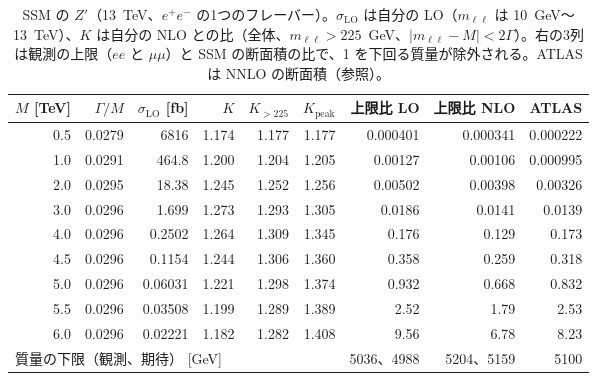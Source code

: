 \documentclass[a4paper,10pt]{ltjsarticle}
\begin{document}
\begin{table}[htbp]
\centering\small
\caption{SSM の $Z'$（13~TeV、$e^+e^-$ の1つのフレーバー）。$\sigma_{\mathrm{LO}}$ は自分の LO（$m_{\ell\ell}$ は 10~GeV〜13~TeV）、$K$ は自分の NLO との比（全体、$m_{\ell\ell}>225$~GeV、$|m_{\ell\ell}-M|<2\Gamma$）。右の3列は観測の上限（$ee$ と $\mu\mu$）と SSM の断面積の比で、1 を下回る質量が除外される。ATLAS は NNLO の断面積（参照）。}
\label{tab:zp}
\begin{tabular}{rrrrrrrrr}
\toprule
$M$ [TeV] & $\Gamma/M$ & $\sigma_{\mathrm{LO}}$ [fb] & $K$ & $K_{>225}$ & $K_{\mathrm{peak}}$ & 上限比 LO & 上限比 NLO & ATLAS \\
\midrule
0.5 & 0.0279 & 6816 & 1.174 & 1.177 & 1.177 & 0.000401 & 0.000341 & 0.000222 \\
1.0 & 0.0291 & 464.8 & 1.200 & 1.204 & 1.205 & 0.00127 & 0.00106 & 0.000995 \\
2.0 & 0.0295 & 18.38 & 1.245 & 1.252 & 1.256 & 0.00502 & 0.00398 & 0.00326 \\
3.0 & 0.0296 & 1.699 & 1.273 & 1.293 & 1.305 & 0.0186 & 0.0141 & 0.0139 \\
4.0 & 0.0296 & 0.2502 & 1.264 & 1.309 & 1.345 & 0.176 & 0.129 & 0.173 \\
4.5 & 0.0296 & 0.1154 & 1.244 & 1.306 & 1.360 & 0.358 & 0.259 & 0.318 \\
5.0 & 0.0296 & 0.06031 & 1.221 & 1.298 & 1.374 & 0.932 & 0.668 & 0.832 \\
5.5 & 0.0296 & 0.03508 & 1.199 & 1.289 & 1.389 & 2.52 & 1.79 & 2.53 \\
6.0 & 0.0296 & 0.02221 & 1.182 & 1.282 & 1.408 & 9.56 & 6.78 & 8.23 \\
\midrule
\multicolumn{6}{l}{質量の下限（観測、期待） [GeV]} & 5036、4988 & 5204、5159 & 5100 \\
\bottomrule
\end{tabular}
\end{table}
\end{document}
